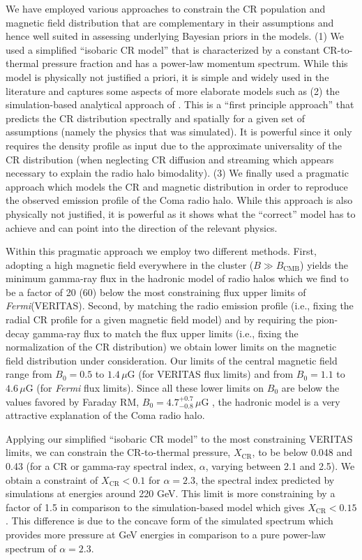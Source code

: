 \documentclass[12pt,manuscript]{aastex}
\def\Fermi{{\em Fermi}\xspace}
\newcommand{\rmn}{\mathrm}
\newcommand{\CR}{\mathrm{CR}}
\begin{document}
We have employed various approaches to constrain the CR population and magnetic field distribution
that are complementary in their assumptions and hence well suited in assessing underlying Bayesian
priors in the models. (1) We used a simplified ``isobaric CR model'' that is characterized by a
constant CR-to-thermal pressure fraction and has a power-law momentum spectrum. While this model
is physically not justified a priori, it is simple and widely used in the literature and captures
some aspects of more elaborate models such as (2) the simulation-based analytical approach of
\citet{article:PinzkePfrommer:2010}. This is a ``first principle approach'' that predicts the CR
distribution spectrally and spatially for a given set of assumptions (namely the physics that was
simulated). It is powerful since it only requires the density profile as input due to the
approximate universality of the CR distribution (when neglecting CR diffusion and streaming which
appears necessary to explain the radio halo bimodality). (3) We finally used a pragmatic
approach which models the CR and magnetic distribution in order to reproduce the observed emission
profile of the Coma radio halo. While this approach is also physically not justified, it is
powerful as it shows what the ``correct'' model has to achieve and can point into the direction of
the relevant physics.

Within this pragmatic approach we employ two different methods. First, adopting a high magnetic
field everywhere in the cluster ($B\gg B_\rmn{CMB}$) yields the minimum gamma-ray flux in the
hadronic model of radio halos which we find to be a factor of 20 (60) below the most constraining
flux upper limits of \Fermi (VERITAS). Second, by matching the radio emission profile (i.e.,
fixing the radial CR profile for a given magnetic field model) and by requiring the pion-decay
gamma-ray flux to match the flux upper limits (i.e., fixing the normalization of the CR
distribution) we obtain lower limits on the magnetic field distribution under consideration. Our
limits of the central magnetic field range from $B_{0} = 0.5$ to $1.4\,\mu$G (for VERITAS  flux
limits) and from $B_{0} = 1.1$ to $4.6\,\mu$G (for \Fermi flux limits). Since all these lower
limits on $B_0$ are below the values favored by Faraday RM, $B_{0} = 4.7^{+0.7}_{-0.8}\,\mu$G
\citep{article:Bonafede_etal:2010}, the hadronic model is a very attractive explanation of the Coma
radio halo.

Applying our simplified ``isobaric CR model'' to the most constraining VERITAS limits, we can
constrain the CR-to-thermal pressure, $X_\CR$, to be below 0.048 and 0.43 (for a CR or gamma-ray
spectral index, $\alpha$, varying between 2.1 and 2.5). We obtain a constraint of $X_\CR<0.1$ for
$\alpha=2.3$, the spectral index predicted by simulations at energies around 220 GeV.  This limit is
more constraining by a factor of 1.5 in comparison to the simulation-based model which gives
$X_\CR<0.15$. This difference is due to the concave form of the simulated spectrum which provides
more pressure at GeV energies in comparison to a pure power-law spectrum of $\alpha=2.3$.
\end{document}
